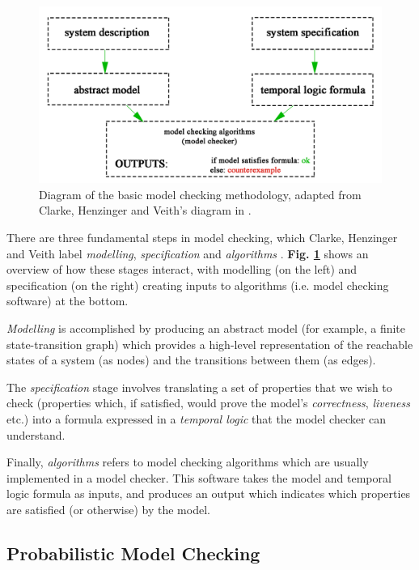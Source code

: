 \documentclass{l4proj}
\begin{document}
\begin{figure}[h]
    \centering
    \includegraphics[scale=0.25]{images/mcheckdiag.png}   
    \caption{Diagram of the basic model checking methodology, adapted from Clarke, Henzinger and Veith's diagram in \cite{hbmc1}.}
    \label{fig:mcheckdiag} 
\end{figure}

There are three fundamental steps in model checking, which Clarke, Henzinger and Veith label \textit{modelling}, \textit{specification} and \textit{algorithms} \cite{hbmc1}. \textbf{Fig. \ref{fig:mcheckdiag}} shows an overview of how these stages interact, with modelling (on the left) and specification (on the right) creating inputs to algorithms (i.e. model checking software) at the bottom. 

\textit{Modelling} is accomplished by producing an abstract model (for example, a finite state-transition graph) which provides a high-level representation of the reachable states of a system (as nodes) and the transitions between them (as edges).

The \textit{specification} stage involves translating a set of properties that we wish to check (properties which, if satisfied, would prove the model's \textit{correctness}, \textit{liveness} etc.) into a formula expressed in a \textit{temporal logic} that the model checker can understand.

Finally, \textit{algorithms} refers to model checking algorithms which are usually implemented in a model checker. This software takes the model and temporal logic formula as inputs, and produces an output which indicates which properties are satisfied (or otherwise) by the model.

\subsection{Probabilistic Model Checking}
\end{document}
